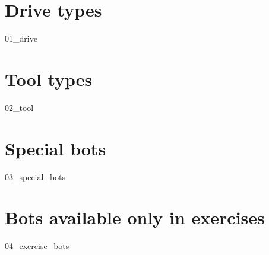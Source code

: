 \chapter{Drive types}
{01_drive}

\chapter{Tool types}
{02_tool}

\chapter{Special bots}
{03_special_bots}

\chapter{Bots available only in exercises}
{04_exercise_bots}